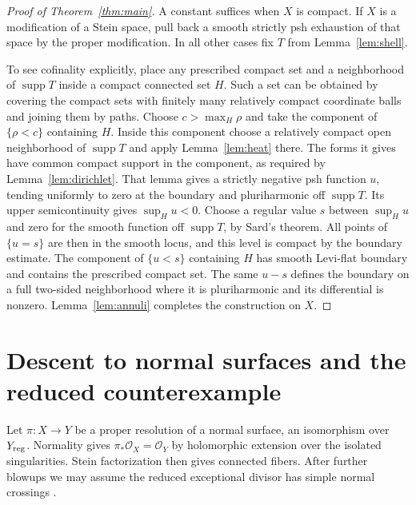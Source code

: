\documentclass[11pt]{amsart}
\theoremstyle{remark}
\numberwithin{equation}{section}
\DeclareMathOperator{\supp}{supp}
\begin{document}
\begin{proof}[Proof of Theorem~\ref{thm:main}]
A constant suffices when \(X\) is compact. If \(X\) is a modification of
a Stein space, pull back a smooth strictly psh exhaustion of that space
by the proper modification. In all other cases fix \(T\) from
Lemma~\ref{lem:shell}.

To see cofinality explicitly, place any prescribed compact set and a
neighborhood of \(\supp T\) inside a compact connected set \(H\). Such a
set can be obtained by covering the compact sets with finitely many
relatively compact coordinate balls and joining them by paths. Choose
\(c>\max_H\rho\) and take the component of \(\{\rho<c\}\) containing
\(H\). Inside this component choose a relatively compact open
neighborhood of \(\supp T\) and apply Lemma~\ref{lem:heat} there.
The forms it gives have common compact support in the component, as
required by Lemma~\ref{lem:dirichlet}. That lemma gives a strictly negative psh function
\(u\), tending uniformly to zero at the boundary and pluriharmonic
off \(\supp T\). Its upper semicontinuity gives \(\sup_H u<0\).
Choose a regular value \(s\) between \(\sup_H u\) and zero for the
smooth function off \(\supp T\), by Sard's theorem. All points of
\(\{u=s\}\) are then in the smooth locus, and this level is compact
by the boundary estimate. The component of \(\{u<s\}\) containing
\(H\) has smooth Levi-flat boundary and contains the prescribed compact
set. The same \(u-s\) defines the boundary on a full two-sided
neighborhood where it is pluriharmonic and its differential is nonzero.
Lemma~\ref{lem:annuli} completes
the construction on \(X\).
\end{proof}

\clearpage
\raggedbottom
\section{Descent to normal surfaces and the reduced counterexample}\label{sec:normal}

Let \(\pi:X\to Y\) be a proper resolution of a normal surface, an
isomorphism over \(Y_{\rm reg}\). Normality gives
\(\pi_*\mathcal O_X=\mathcal O_Y\) by holomorphic extension over the
isolated singularities. Stein factorization then gives connected fibers.
After further blowups we may assume the reduced exceptional divisor has
simple normal crossings \cite{BierMil}.
\end{document}
